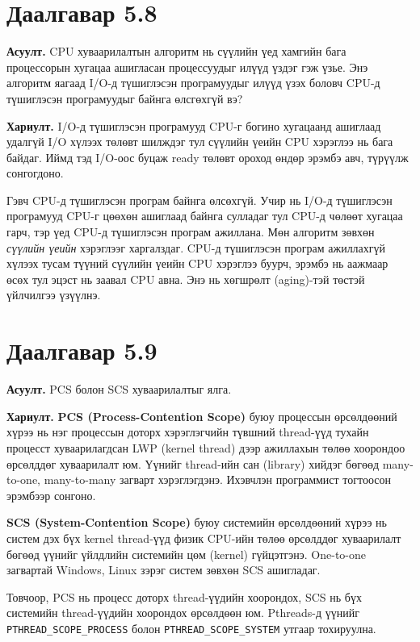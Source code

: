 \documentclass[12pt,a4paper]{article}
\newcommand{\q}[1]{\par\noindent\textbf{Асуулт.} #1\par}
\newcommand{\ans}{\par\noindent\textbf{Хариулт.} }
\begin{document}
\section{Даалгавар 5.8}
\q{CPU хуваарилалтын алгоритм нь сүүлийн үед хамгийн бага процессорын хугацаа ашигласан процессуудыг илүүд үздэг гэж үзье. Энэ алгоритм яагаад I/O-д түшиглэсэн програмуудыг илүүд үзэх боловч CPU-д түшиглэсэн програмуудыг байнга өлсгөхгүй вэ?}
\ans I/O-д түшиглэсэн програмууд CPU-г богино хугацаанд ашиглаад удалгүй I/O хүлээх төлөвт шилждэг тул сүүлийн үеийн CPU хэрэглээ нь бага байдаг. Иймд тэд I/O-оос буцаж ready төлөвт ороход өндөр эрэмбэ авч, түрүүлж сонгогдоно.

Гэвч CPU-д түшиглэсэн програм байнга өлсөхгүй. Учир нь I/O-д түшиглэсэн програмууд CPU-г цөөхөн ашиглаад байнга сулладаг тул CPU-д чөлөөт хугацаа гарч, тэр үед CPU-д түшиглэсэн програм ажиллана. Мөн алгоритм зөвхөн \emph{сүүлийн үеийн} хэрэглээг харгалздаг. CPU-д түшиглэсэн програм ажиллахгүй хүлээх тусам түүний сүүлийн үеийн CPU хэрэглээ буурч, эрэмбэ нь аажмаар өсөх тул эцэст нь заавал CPU авна. Энэ нь хөгшрөлт (aging)-тэй төстэй үйлчилгээ үзүүлнэ.

\section{Даалгавар 5.9}
\q{PCS болон SCS хуваарилалтыг ялга.}
\ans
\textbf{PCS (Process-Contention Scope)} буюу процессын өрсөлдөөний хүрээ нь нэг процессын доторх хэрэглэгчийн түвшний thread-үүд тухайн процесст хуваарилагдсан LWP (kernel thread) дээр ажиллахын төлөө хоорондоо өрсөлддөг хуваарилалт юм. Үүнийг thread-ийн сан (library) хийдэг бөгөөд many-to-one, many-to-many загварт хэрэглэгдэнэ. Ихэвчлэн программист тогтоосон эрэмбээр сонгоно.

\textbf{SCS (System-Contention Scope)} буюу системийн өрсөлдөөний хүрээ нь систем дэх бүх kernel thread-үүд физик CPU-ийн төлөө өрсөлддөг хуваарилалт бөгөөд үүнийг үйлдлийн системийн цөм (kernel) гүйцэтгэнэ. One-to-one загвартай Windows, Linux зэрэг систем зөвхөн SCS ашигладаг.

Товчоор, PCS нь процесс доторх thread-үүдийн хоорондох, SCS нь бүх системийн thread-үүдийн хоорондох өрсөлдөөн юм. Pthreads-д үүнийг \texttt{PTHREAD\_SCOPE\_PROCESS} болон \texttt{PTHREAD\_SCOPE\_SYSTEM} утгаар тохируулна.

\end{document}
